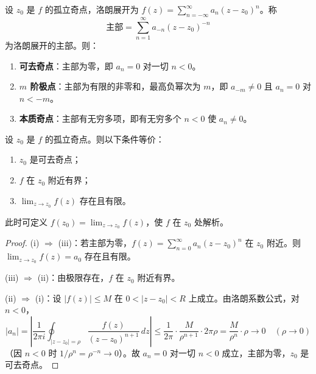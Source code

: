 \begin{definition}[孤立奇点的分类]\label{def:ca_singularity_types}
设 $z_0$ 是 $f$ 的孤立奇点，洛朗展开为 $f(z) = \sum_{n=-\infty}^{\infty} a_n (z - z_0)^n$。称
\[
\text{主部} = \sum_{n=1}^{\infty} a_{-n} (z - z_0)^{-n}
\]
为洛朗展开的主部。则：
\begin{enumerate}[label=(\roman*)]
    \item \textbf{可去奇点}：主部为零，即 $a_n = 0$ 对一切 $n < 0$。
    \item \textbf{$m$ 阶极点}：主部为有限的非零和，最高负幂次为 $m$，即 $a_{-m} \neq 0$ 且 $a_n = 0$ 对 $n < -m$。
    \item \textbf{本质奇点}：主部有无穷多项，即有无穷多个 $n < 0$ 使 $a_n \neq 0$。
\end{enumerate}
\end{definition}

\begin{theorem}[可去奇点的刻画]\label{thm:ca_removable_singularity}
设 $z_0$ 是 $f$ 的孤立奇点。则以下条件等价：
\begin{enumerate}[label=(\roman*)]
    \item $z_0$ 是可去奇点；
    \item $f$ 在 $z_0$ 附近有界；
    \item $\lim_{z \to z_0} f(z)$ 存在且有限。
\end{enumerate}
此时可定义 $f(z_0) = \lim_{z \to z_0} f(z)$，使 $f$ 在 $z_0$ 处解析。
\end{theorem}

\begin{proof}
(i) $\Rightarrow$ (iii)：若主部为零，$f(z) = \sum_{n=0}^{\infty} a_n (z - z_0)^n$ 在 $z_0$ 附近。则 $\lim_{z \to z_0} f(z) = a_0$ 存在且有限。

(iii) $\Rightarrow$ (ii)：由极限存在，$f$ 在 $z_0$ 附近有界。

(ii) $\Rightarrow$ (i)：设 $|f(z)| \le M$ 在 $0 < |z - z_0| < R$ 上成立。由洛朗系数公式，对 $n < 0$，
\[
|a_n| = \left| \frac{1}{2\pi i} \oint_{|z - z_0| = \rho} \frac{f(z)}{(z - z_0)^{n+1}} \, dz \right| \le \frac{1}{2\pi} \cdot \frac{M}{\rho^{n+1}} \cdot 2\pi \rho = \frac{M}{\rho^n} \cdot \rho \to 0 \quad (\rho \to 0)
\]
（因 $n < 0$ 时 $1/\rho^n = \rho^{-n} \to 0$）。故 $a_n = 0$ 对一切 $n < 0$ 成立，主部为零，$z_0$ 是可去奇点。
\end{proof}

